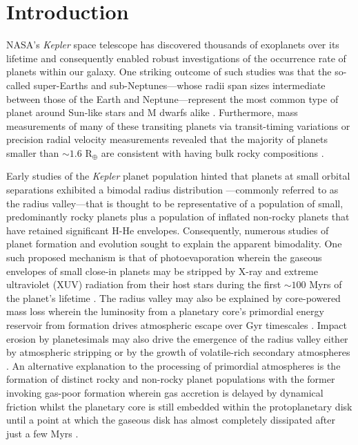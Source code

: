 \documentclass[twocolumn]{emulateapj}
\newcommand{\kepler}[1]{\emph{Kepler}#1}
\begin{document}
\section{Introduction}
NASA's \kepler{} space telescope has discovered thousands of exoplanets over its lifetime and
consequently enabled robust investigations of the occurrence rate of planets within our galaxy.
One striking outcome of such studies was that the so-called super-Earths and sub-Neptunes---whose
radii span sizes intermediate between those of the Earth and Neptune---represent the most common
type of planet around Sun-like stars and M dwarfs alike
\citep[e.g.][]{youdin11,howard12,dressing13,fressin13,petigura13b,morton14,dressing15a,mulders15a,gaidos16,fulton17,hardegree19}.
Furthermore, mass measurements of many of these transiting planets via transit-timing variations
or precision radial velocity measurements revealed that the majority of planets
smaller than $\sim 1.6$ R$_{\oplus}$ are consistent with having bulk rocky compositions
\citep[e.g.][]{weiss14,dressing15b,rogers15}.

Early studies of the \kepler{} planet population
hinted that planets at small orbital separations exhibited a
bimodal radius distribution \citep[e.g.][]{owen13}---commonly referred to as the radius valley---that
is thought to be representative of a population of small, predominantly rocky planets plus a population
of inflated non-rocky planets that have retained significant H-He envelopes.
Consequently, numerous studies of planet formation and evolution sought to explain the
apparent bimodality. One such proposed mechanism is
that of photoevaporation wherein the gaseous envelopes of small close-in planets may be stripped by
X-ray and extreme ultraviolet (XUV) radiation from their host stars during the first $\sim 100$ Myrs
of the planet's lifetime
\citep{jackson12,owen13,jin14,lopez14,chen16,owen17,jin18,lopez18}.
The radius valley may also be explained by core-powered mass loss wherein the
luminosity from a planetary core's primordial energy reservoir from formation drives atmospheric escape
over Gyr timescales \citep{ginzburg18,gupta19a,gupta19b}.
Impact erosion by planetesimals may also drive the emergence of the radius valley either by atmospheric
stripping or by the growth of volatile-rich secondary atmospheres \citep{shuvalov09,schlichting15,wyatt19}. 
An alternative explanation to the processing of primordial atmospheres is the formation of distinct rocky and
non-rocky planet populations with the former invoking gas-poor formation wherein gas accretion is delayed
by dynamical friction whilst the
planetary core is still embedded within the protoplanetary disk until a point at which the gaseous disk
has almost completely dissipated after just a few Myrs \citep{lee14,lee16,lopez18}.
\end{document}
